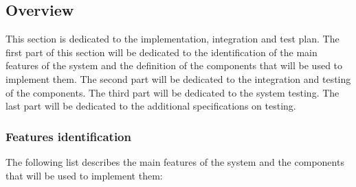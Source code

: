 \subsection{Overview}
This section is dedicated to the implementation, integration and test plan. The first part of this section will be dedicated to the identification of the main features of the system and the definition of the components that will be used to implement them. The second part will be dedicated to the integration and testing of the components. The third part will be dedicated to the system testing. The last part will be dedicated to the additional specifications on testing.
\subsubsection{Features identification}
The following list describes the main features of the system and the components that will be used to implement them:
